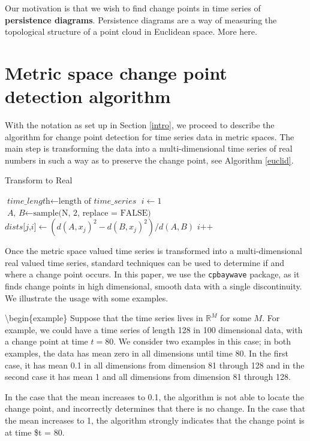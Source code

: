 \documentclass[smallextended]{svjour3}       %
\begin{document}
Our motivation is that we wish to find change points in time series of
\textbf{persistence diagrams}. Persistence diagrams are a way of
measuring the topological structure of a point cloud in Euclidean space.
More here.

\section{Metric space change point detection algorithm}\label{sec:1}

With the notation as set up in Section \ref{intro}, we proceed to
describe the algorithm for change point detection for time series data
in metric spaces. The main step is transforming the data into a
multi-dimensional time series of real numbers in such a way as to
preserve the change point, see Algorithm \ref{euclid}.

\begin{algorithm}
\caption{Transform to Real}\label{euclid}
\begin{algorithmic}[1]
\State $\textit{time\_length} \gets \text{length of }\textit{time\_series}$
\State $i \gets 1$
\State $\textit{A, B} \gets \text{sample(N, 2, replace = FALSE)}$
\State $\textit{dists[j,i]} \gets (d(A, x_j)^2 - d(B, x_j)^2)/d(A, B)$
\EndFor
\State $\textit{i++}$
\EndWhile
\EndProcedure
\end{algorithmic}
\end{algorithm}

Once the metric space valued time series is transformed into a
multi-dimensional real valued time series, standard techniques can be
used to determine if and where a change point occurs. In this paper, we
use the \texttt{cpbaywave} package, as it finds change points in high
dimensional, smooth data with a single discontinuity. We illustrate the
usage with some examples.

\textbackslash{}begin\{example\} Suppose that the time series lives in
\(\mathbb {R}^M\) for some \(M\). For example, we could have a time
series of length 128 in 100 dimensional data, with a change point at
time \(t = 80\). We consider two examples in this case; in both
examples, the data has mean zero in all dimensions until time 80. In the
first case, it has mean 0.1 in all dimensions from dimension 81 through
128 and in the second case it has mean 1 and all dimensions from
dimension 81 through 128.

In the case that the mean increases to 0.1, the algorithm is not able to
locate the change point, and incorrectly determines that there is no
change. In the case that the mean increases to 1, the algorithm strongly
indicates that the change point is at time \$t = 80.
\end{document}
